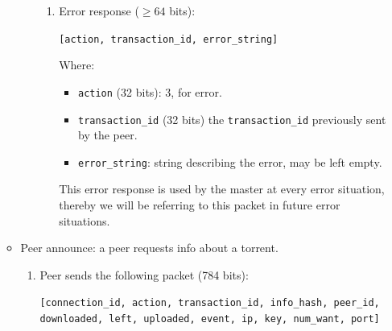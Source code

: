\documentclass[twoside,a4paper,10pt]{article}
\begin{document}
\begin{itemize}
\begin{itemize}
\begin{enumerate}
\begin{enumerate}
      \item Error response ($\geq64$ bits)\label{it:error-response}:
        
        \texttt{[action, transaction\_id, error\_string]} 

        Where:
        \begin{itemize}
        \item \texttt{action} (32 bits): 3, for error.
        \item \texttt{transaction\_id} (32 bits)
          the \texttt{transaction\_id} previously sent by the peer.
        \item \texttt{error\_string}: string describing the error, may be left
          empty.
        \end{itemize}

        This error response is used by the master at every error situation,
        thereby we will be referring to this packet in future error situations.
        
      \end{enumerate}
    \end{enumerate}

  \item Peer announce: a peer requests info about a torrent.
    \begin{enumerate}
    \item Peer sends the following packet (784 bits):

      \texttt{[connection\_id, action, transaction\_id, info\_hash, peer\_id,
          downloaded, left, uploaded, event, ip, key, num\_want, port]}


\end{enumerate}
\end{itemize}
\end{itemize}
\end{document}
